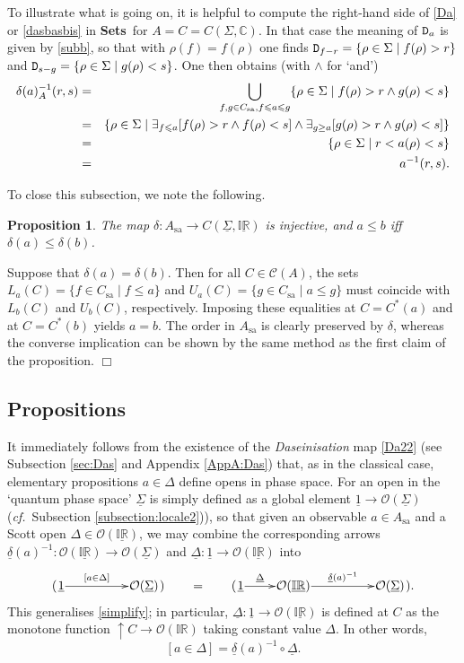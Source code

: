 \documentclass[12pt]{article}
\newcommand{\IR}{\mathbb{IR}}
\newcommand{\uIR}{\underline{\mathbb{IR}}}
\newcommand{\beq}{\begin{equation}}
\newcommand{\eeq}{\end{equation}}
\newcommand{\Sets}{\mbox{\textbf{Sets}}}
\newcommand{\raw}{\rightarrow} \newcommand{\rat}{\mapsto}
\newcommand{\inv}{^{-1}}
\newcommand{\er}{\eqref}
\newcommand{\dl}{\delta} \newcommand{\Dl}{\Delta}
\newcommand{\rh}{\rho} \newcommand{\sg}{\sigma}
\newcommand{\Sg}{\Sigma} \newcommand{\ta}{\tau} \newcommand{\ph}{\phi}
\newcommand{\CA}{{\mathcal A}} \newcommand{\CB}{{\mathcal B}}
\newcommand{\CO}{{\mathcal O}} \newcommand{\CP}{{\mathcal P}}
\newcommand{\C}{{\mathbb C}} \newcommand{\D}{{\mathbb D}}
\newcommand{\alg}[1]{\ensuremath{#1}}
\newcommand{\functor}[1]{\ensuremath{\underline{#1}}}
\newcommand{\context}{\ensuremath{\mathcal{C}}}
\newcommand{\sa}{\ensuremath{_{\mathrm{sa}}}}
\newcommand{\prop}[1]{\ensuremath{\mbox{\texttt{#1}}}}
\renewcommand{\CA}{\mathcal{C}(A)}
\newcommand{\ulS}{\functor{\Sigma}}
\renewcommand{\CA}{\context(\alg{A})}
\newtheorem{proposition}[theorem]{Proposition}
\newenvironment{proof}[1][Proof]%
{ \begin{trivlist}%
  \item[\hskip \labelsep {\bfseries #1}]%
}%
{ \end{trivlist}%
}
\newcommand{\qed}{\nobreak\hfill$\Box$}
\begin{document}
To illustrate what is going on, it is helpful to
 compute the right-hand side of \er{Da} or \er{dasbasbis} in \Sets\ for $A=C=C(\Sigma,\C)$.  In that case the meaning of $\prop{D}_a$ is given by \er{subb}, so that with $\rh(f)=f(\rh)$ one finds
 $\prop{D}_{f-r}=\{\rh\in\Sg\mid f(\rh)>r\}$ and $\prop{D}_{s-g}=\{\rh\in\Sg\mid g(\rh)<s\}$.
One then obtains (with $\wedge$ for `and')
  \begin{eqnarray}
\dl(a)_A^{-1}(r,s)&=& \bigcup_{ f,g\in C\sa, f \leqslant a \leqslant g}\{\rh\in\Sg\mid f(\rh)>r \wedge
g(\rh)<s\} \nn \\ &=&
 \{\rho \in \Sg \mid \exists_{f \leqslant a}[f(\rho)>r \wedge f(\rho)<s]
     \wedge\exists_{g \geq a}[g(\rho)> r \wedge g(\rho)<s]\}\nn \\
  & =& \{\rho \in \Sg \mid r < a(\rho) < s\}\nn \\
  & = &a^{-1}(r,s). \label{ainverse}\end{eqnarray}

 To close this subsection, we note the following.
\begin{proposition}
\label{prop:selfadjointsascuts}
  The map $\dl:A\sa\raw C(\ulS,\uIR)$ is injective, and
  $a\leqslant b$ iff $\dl(a)\leqslant\dl(b)$.
\end{proposition}
\begin{proof}
  Suppose that $\dl(a)=\dl(b)$. Then for all $\alg{C} \in\CA$,
  the sets $L_a(C)=\{f\in C\sa\mid f\leqslant a\}$ and $U_a(C)=\{g\in
  C\sa\mid a\leqslant g\}$ must coincide with $L_b(C)$ and $U_b(C)$, respectively.
  Imposing these equalities at $C=C^*(a)$ and at $C=C^*(b)$ yields $a=b$.
  The order in $A\sa$ is clearly preserved by $\dl$, whereas the
  converse implication can be shown by the same method as the first
  claim of the proposition.
  \qed
\end{proof}

\subsection{Propositions}
It immediately follows from the existence of the {\it Daseinisation} map \er{Da22} (see
Subsection \ref{sec:Das} and  Appendix \ref{AppA:Das})
that, as in the classical case, elementary propositions $a\in\Dl$
define opens in phase space. For an open in the `quantum phase space'
$\ulS$ is simply defined as a global element
$\underline{1}\raw\CO(\ulS)$ ({\it cf.}\ Subsection
\ref{subsection:locale2})), so that given an observable $a\in A\sa$ and
a Scott open $\Delta\in\CO(\uIR)$, we may combine the corresponding arrows
$\underline{\dl}(a)\inv:\CO(\uIR)\to\CO(\ulS)$ and
$\underline{\Delta}:\underline{1} \to \CO(\uIR)$
 into
\beq
 ( \xymatrix@1{\underline{1} \ar^-{[a\in\Dl]}[rr] && \CO(\ulS)})
  \qquad = \qquad
  (\xymatrix@1{\underline{1} \ar^-{\underline{\Delta}}[r] & \CO(\uIR)
  \ar^-{\underline{\dl}(a)\inv}[rr] && \CO(\ulS)}).
  \label{pijl}
\eeq
This generalises \er{simplify}; in particular, $\underline{\Delta}:\underline{1} \to \CO(\uIR)$ is
defined at $C$
as  the monotone function $\uparrow\!C\raw  \CO(\IR)$ taking constant value $\Delta$.
 In other words, 
\beq
  \label{eq:physicalproposition}
  [a\in\Dl]= \underline{\dl}(a)\inv\circ\underline{\Delta}.
\eeq
\end{document}
